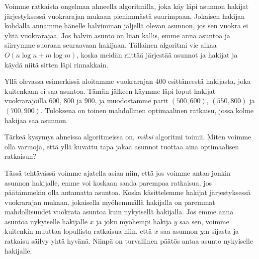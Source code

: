 Voimme ratkaista ongelman ahneella algoritmilla,
joka käy läpi asunnon hakijat järjestyksessä vuokrarajan
mukaan pienimmästä suurimpaan.
Jokaisen hakijan kohdalla annamme hänelle halvimman
jäljellä olevan asunnon, jos sen vuokra ei ylitä vuokrarajaa.
Jos halvin asunto on liian kallis, emme anna asuntoa ja
siirrymme suoraan seuraavaan hakijaan.
Tällainen algoritmi vie aikaa $O(n \log n + m \log m)$,
koska meidän riittää järjestää asunnot ja hakijat
ja käydä niitä sitten läpi rinnakkain.

Yllä olevassa esimerkissä aloitamme vuokrarajan 400
esittäneestä hakijasta, joka kuitenkaan ei saa asuntoa.
Tämän jälkeen käymme läpi loput hakijat
vuokrarajoilla 600, 800 ja 900, ja muodostamme parit
$(500,600)$, $(550,800)$ ja $(700,900)$.
Tuloksena on toinen mahdollinen optimaalinen ratkaisu,
jossa kolme hakijaa saa asunnon.

Tärkeä kysymys ahneissa algoritmeissa on, \emph{miksi}
algoritmi toimii. Miten voimme olla varmoja, että yllä kuvattu tapa
jakaa asunnot tuottaa aina optimaalisen ratkaisun?

Tässä tehtävässä voimme ajatella asiaa niin,
että jos voimme antaa jonkin asunnon hakijalle,
emme voi koskaan saada parempaa ratkaisua,
jos päätämmekin olla antamatta asuntoa.
Koska käsittelemme hakijat järjestyk\-sessä vuokrarajan mukaan,
jokaisella myöhemmällä hakijalla on paremmat mahdollisuudet
vuokrata asuntoa kuin nykyisellä hakijalla.
Jos emme anna asuntoa nykyiselle hakijalle $x$
ja joku myöhempi hakija $y$ saa sen, voimme kuitenkin 
muuttaa lopullista ratkaisua niin, että $x$
saa asunnon $y$:n sijasta ja ratkaisu säilyy yhtä hyvänä.
Niinpä on turvallinen päätös antaa asunto nykyiselle hakijalle.